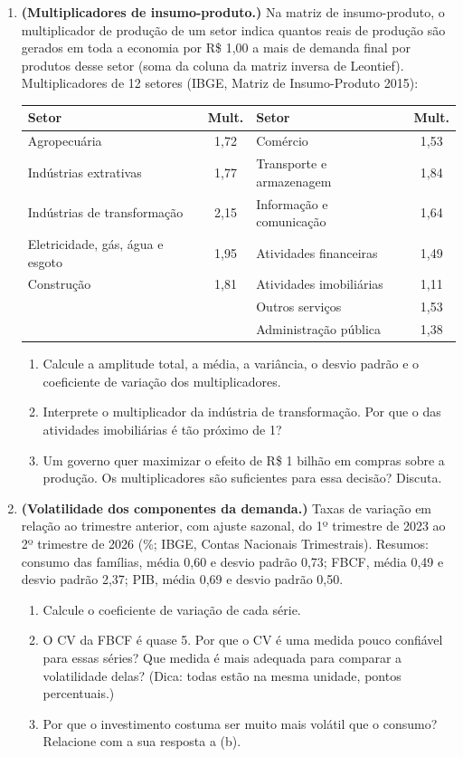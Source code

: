 \documentclass[11pt]{article}
\begin{document}
\begin{enumerate}[label=\textbf{A\arabic*.}, leftmargin=*]
\item \textbf{(Multiplicadores de insumo-produto.)} Na matriz de insumo-produto, o multiplicador de produção de um setor indica quantos reais
de produção são gerados em toda a economia por R\$ 1,00 a mais de demanda final por produtos desse setor (soma da coluna da matriz inversa de Leontief).
Multiplicadores de 12 setores (IBGE, Matriz de Insumo-Produto 2015):
\begin{center}
\small
\begin{tabular}{lc|lc}
\toprule
Setor & Mult. & Setor & Mult. \\
\midrule
Agropecuária & 1,72 & Comércio & 1,53 \\
Indústrias extrativas & 1,77 & Transporte e armazenagem & 1,84 \\
Indústrias de transformação & 2,15 & Informação e comunicação & 1,64 \\
Eletricidade, gás, água e esgoto & 1,95 & Atividades financeiras & 1,49 \\
Construção & 1,81 & Atividades imobiliárias & 1,11 \\
 & & Outros serviços & 1,53 \\
 & & Administração pública & 1,38 \\
\bottomrule
\end{tabular}
\end{center}
\begin{enumerate}[label=(\alph*)]
  \item Calcule a amplitude total, a média, a variância, o desvio padrão e o coeficiente de variação dos multiplicadores.
  \item Interprete o multiplicador da indústria de transformação. Por que o das atividades imobiliárias é tão próximo de 1?
  \item Um governo quer maximizar o efeito de R\$ 1 bilhão em compras sobre a produção. Os multiplicadores são suficientes para essa decisão? Discuta.
\end{enumerate}

\item \textbf{(Volatilidade dos componentes da demanda.)} Taxas de variação em relação ao trimestre anterior, com ajuste sazonal, do 1º trimestre de 2023 ao
2º trimestre de 2026 (\%; IBGE, Contas Nacionais Trimestrais). Resumos: consumo das famílias, média 0,60 e desvio padrão 0,73; FBCF,
média 0,49 e desvio padrão 2,37; PIB, média 0,69 e desvio padrão 0,50.
\begin{enumerate}[label=(\alph*)]
  \item Calcule o coeficiente de variação de cada série.
  \item O CV da FBCF é quase 5. Por que o CV é uma medida pouco confiável para essas séries? Que medida é mais adequada para comparar a volatilidade
    delas? (Dica: todas estão na mesma unidade, pontos percentuais.)
  \item Por que o investimento costuma ser muito mais volátil que o consumo? Relacione com a sua resposta a (b).
\end{enumerate}

\end{enumerate}
\end{document}
